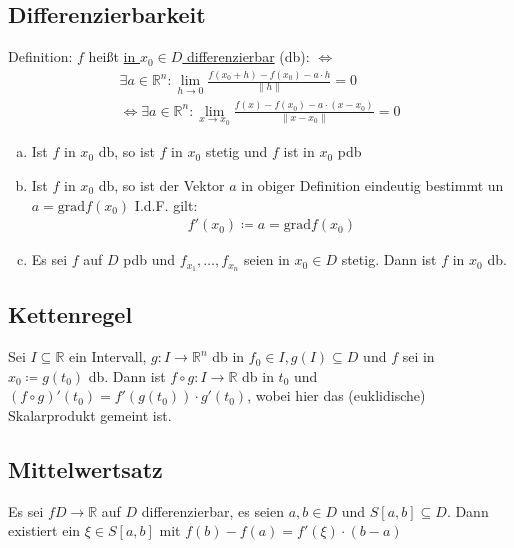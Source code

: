 \subsection{Differenzierbarkeit}
Definition: $f$ heißt \underline{in $x_0 \in D$ differenzierbar} (db): $\Leftrightarrow$
\begin{align*}
    \exists a \in \mathbb{R}^n: \lim \limits_{h \to 0} \frac{f(x_0+h) -f(x_0) - a\cdot h}{\lVert h \rVert} = 0 \\
    \Leftrightarrow \exists a \in \mathbb{R}^n : \lim \limits_{x \to x_0} \frac{f(x) -f(x_0) - a\cdot (x-x_0)}{\lVert x-x_0 \rVert} = 0
\end{align*}
\begin{enumerate}[a)]
    \item Ist $f$ in $x_0$ db, so ist $f$ in $x_0$ stetig und $f$ ist in $x_0$ pdb
    \item Ist $f$ in $x_0$ db, so ist der Vektor $a$ in obiger Definition eindeutig bestimmt un $a=\text{grad}f(x_0)$ I.d.F. gilt:
    \begin{align*}
        f'(x_0) \coloneqq a = \text{grad}f(x_0)
    \end{align*}
    \item Es sei $f$ auf $D$ pdb und $f_{x_1},\ldots,f_{x_n}$ seien in $x_0 \in D$ stetig. Dann ist $f$ in $x_0$ db.
\end{enumerate}

\subsection{Kettenregel}
Sei $I \subseteq \mathbb{R}$ ein Intervall, $g: I \to \mathbb{R}^n$ db in $f_0 \in I, g(I) \subseteq D$ und $f$ sei in $x_0 \coloneqq g(t_0)$ db. 
Dann ist $f \circ g: I \to \mathbb{R}$ db in $t_0$ und $(f \circ g)' (t_0) = f'(g(t_0)) \cdot g'(t_0)$, wobei hier das (euklidische) Skalarprodukt gemeint ist.

\subsection{Mittelwertsatz}
Es sei $f D \to \mathbb{R}$ auf $D$ differenzierbar, es seien $a,b \in D$ und $S[a,b] \subseteq D$. Dann existiert ein $\xi \in S[a,b]$ mit $f(b) - f(a) = f'(\xi) \cdot (b-a)$

